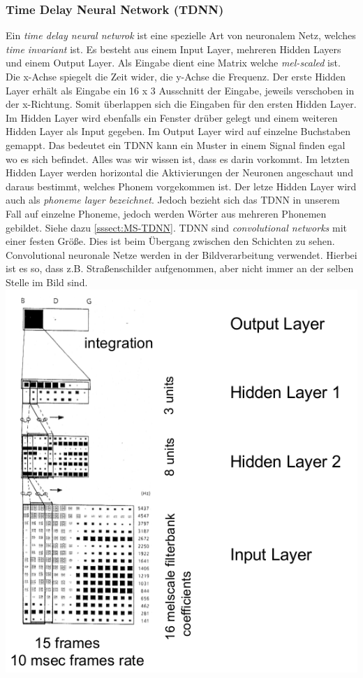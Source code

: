 \subsubsection{Time Delay Neural Network (TDNN)}
\label{sssect:TDNN}
Ein \textit{time delay neural netwrok} ist eine spezielle Art von neuronalem Netz, welches \textit{time invariant} ist. Es besteht aus einem Input Layer, mehreren Hidden Layers und einem Output Layer.
Als Eingabe dient eine Matrix welche \textit{mel-scaled} ist. Die x-Achse spiegelt die Zeit wider, die y-Achse die Frequenz. Der erste Hidden Layer erhält als Eingabe ein 16 x 3 Ausschnitt der Eingabe, jeweils verschoben in der x-Richtung. Somit überlappen sich die Eingaben für den ersten Hidden Layer. Im Hidden Layer wird ebenfalls ein Fenster drüber gelegt und einem weiteren Hidden Layer als Input gegeben. Im Output Layer wird auf einzelne Buchstaben gemappt. Das bedeutet ein TDNN kann ein Muster in einem Signal finden egal wo es sich befindet. Alles was wir wissen ist, dass es darin vorkommt.
Im letzten Hidden Layer werden horizontal die Aktivierungen der Neuronen angeschaut und daraus bestimmt, welches Phonem vorgekommen ist. Der letze Hidden Layer wird auch als \textit{phoneme layer bezeichnet}. Jedoch bezieht sich das TDNN in unserem Fall auf einzelne Phoneme, jedoch werden Wörter aus mehreren Phonemen gebildet. Siehe dazu \ref{sssect:MS-TDNN}.
TDNN sind \textit{convolutional networks} mit einer festen Größe. Dies ist beim Übergang zwischen den Schichten zu sehen. Convolutional neuronale Netze werden in der Bildverarbeitung verwendet. Hierbei ist es so, dass z.B. Straßenschilder aufgenommen, aber nicht immer an der selben Stelle im Bild sind.\\
\includegraphics[scale=0.5]{tdnn}
